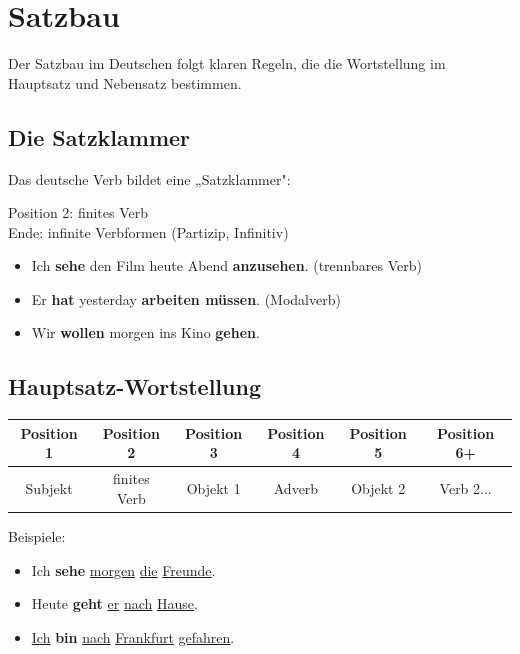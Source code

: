 \chapter{Satzbau}
\label{cha:Satzbau}

Der Satzbau im Deutschen folgt klaren Regeln, die die Wortstellung im Hauptsatz und Nebensatz bestimmen.

\section{Die Satzklammer}
\label{sec:Satzklammer}

Das deutsche Verb bildet eine „Satzklammer":

\begin{tcolorbox}[title=Satzklammer]
\begin{center}
Position 2: finites Verb \\
Ende: infinite Verbformen (Partizip, Infinitiv)
\end{center}
\end{tcolorbox}

\begin{itemize}
    \item Ich \textbf{sehe} den Film heute Abend \textbf{anzusehen}. (trennbares Verb)
    \item Er \textbf{hat} yesterday \textbf{arbeiten müssen}. (Modalverb)
    \item Wir \textbf{wollen} morgen ins Kino \textbf{gehen}.
\end{itemize}

\section{Hauptsatz-Wortstellung}
\label{sec:Hauptsatz}

\begin{center}
\begin{tabular}{|c|c|c|c|c|c|}
\hline
\textbf{Position 1} & \textbf{Position 2} & \textbf{Position 3} & \textbf{Position 4} & \textbf{Position 5} & \textbf{Position 6+} \\ \hline
Subjekt & finites Verb & Objekt 1 & Adverb & Objekt 2 & Verb 2... \\ \hline
\end{tabular}
\end{center}

Beispiele:
\begin{itemize}
    \item Ich \textbf{sehe} \underline{morgen} \underline{die} \underline{Freunde}.
    \item Heute \textbf{geht} \underline{er} \underline{nach} \underline{Hause}.
    \item \underline{Ich} \textbf{bin} \underline{nach} \underline{Frankfurt} \underline{gefahren}.
\end{itemize}

